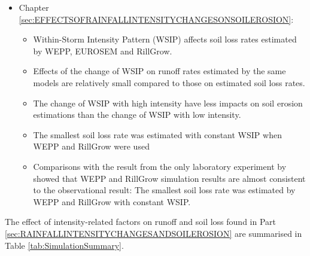 \begin{itemize}
  \item Chapter \ref{sec:EFFECTSOFRAINFALLINTENSITYCHANGESONSOILEROSION}:
    \begin{itemize}
      \item Within-Storm Intensity Pattern (WSIP) affects soil loss rates
estimated by WEPP, EUROSEM and RillGrow.
      \item Effects of the change of WSIP on runoff rates estimated by the same
models are relatively small compared to those on estimated soil loss rates.
      \item The change of WSIP with high intensity have less impacts on soil
erosion estimations than the change of WSIP with low intensity.
      \item The smallest soil loss rate was estimated with constant WSIP when
WEPP and RillGrow were used
      \item Comparisons with the result from the only laboratory experiment by
\citet{parsons2006-68} showed that WEPP and RillGrow simulation results are
almost consistent to the observational result: The smallest soil loss rate was
estimated by WEPP and RillGrow with constant WSIP.
    \end{itemize}
\end{itemize}

The effect of intensity-related factors on runoff and soil loss found in Part
\ref{sec:RAINFALLINTENSITYCHANGESANDSOILEROSION} are summarised in Table
\ref{tab:SimulationSummary}.

